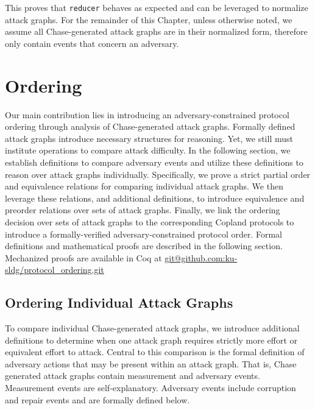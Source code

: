 \documentclass[runningheads]{llncs}
\theoremstyle{definition}
\begin{document}
\noindent This proves that \texttt{reducer} behaves as expected and can be leveraged to normalize attack graphs. For the remainder of this Chapter, unless otherwise noted, we assume all Chase-generated attack graphs are in their normalized form, therefore only contain events that concern an adversary.

\section{Ordering}

Our main contribution lies in introducing an adversary-constrained protocol ordering through analysis of Chase-generated attack graphs. Formally defined attack graphs introduce necessary structures for reasoning. Yet, we still must institute operations to compare attack difficulty. In the following section, we establish definitions to compare adversary events and utilize these definitions to reason over attack graphs individually. Specifically, we prove a strict partial order and equivalence relations for comparing individual attack graphs. We then leverage these relations, and additional definitions, to introduce equivalence and preorder relations over sets of attack graphs. Finally, we link the ordering decision over sets of attack graphs to the corresponding Copland protocols to introduce a formally-verified adversary-constrained protocol order. Formal definitions and mathematical proofs are described in the following section. Mechanized proofs are available in Coq at \url{git@github.com:ku-sldg/protocol_ordering.git}

\subsection*{Ordering Individual Attack Graphs}

To compare individual Chase-generated attack graphs, we introduce additional definitions to determine when one attack graph requires strictly more effort or equivalent effort to attack. Central to this comparison is the formal definition of adversary actions that may be present within an attack graph. That is, Chase generated attack graphs contain measurement and adversary events. Measurement events are self-explanatory. Adversary events include corruption and repair events and are formally defined below.

\end{document}
